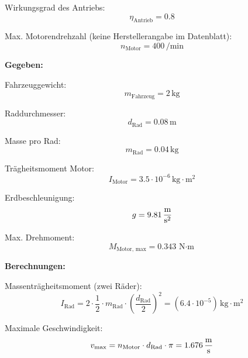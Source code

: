 \documentclass[main.  tex]{subfiles} %
\begin{document}
\vspace{0.2cm}

Wirkungsgrad des Antriebs:
\[
\eta_{\text{Antrieb}} = 0.8
\]

\vspace{0.2cm}

Max. Motorendrehzahl (keine Herstellerangabe im Datenblatt):
\[
n_{\text{Motor}} = 400 \, \si{\per\minute} 
\]

\vspace{0.5cm}

\textbf{Gegeben:}

\vspace{0.2cm}

Fahrzeuggewicht:
\[
m_{\text{Fahrzeug}} = 2 \, \si{\kilogram}
\]

\vspace{0.2cm}

Raddurchmesser:
\[
d_{\text{Rad}} = 0.08 \, \si{\meter}
\]

\vspace{0.2cm}

Masse pro Rad:
\[
m_{\text{Rad}} = 0.04 \, \si{\kilogram}
\]

\vspace{0.2cm}

Trägheitsmoment Motor:
\[
I_{\text{Motor}} = 3.5 \cdot 10^{-6} \, \si{\kilogram \cdot \meter\squared}
\]

\vspace{0.2cm}

Erdbeschleunigung:
\[
g = 9.81 \, \si{\frac{\meter}{\second\squared}}
\]

\vspace{0.2cm}

Max. Drehmoment:
\[
M_{\text{Motor, max}} = 0.343 \, \si{\newton \cdot \meter}
\]

\vspace{0.5cm}

\textbf{Berechnungen:}

\vspace{0.2cm}

Massenträgheitsmoment (zwei Räder):
\[
I_{\text{Rad}} = 2 \cdot \frac{1}{2} \cdot m_{\text{Rad}} \cdot \left( \frac{d_{\text{Rad}}}{2} \right)^2 = (6.4 \cdot 10^{-5}) \, \si{\kilogram \cdot \meter\squared}
\]

\vspace{0.2cm}

Maximale Geschwindigkeit:
\[
v_{\text{max}} = n_{\text{Motor}} \cdot d_{\text{Rad}} \cdot \pi = 1.676 \, \si{\frac{\meter}{\second}}
\]
\end{document}

